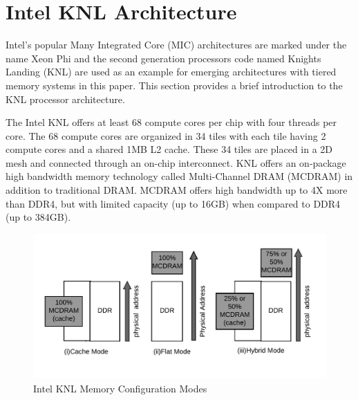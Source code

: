 \section{Intel KNL Architecture}
\label{src:knl}

Intel's popular Many Integrated Core (MIC) architectures are marked
under the name Xeon Phi and the second generation processors code
named Knights Landing (KNL) are used as an example for emerging
architectures with tiered memory systems in this paper. This section
provides a brief introduction to the KNL processor architecture.

The Intel KNL offers at least 68 compute cores per chip with four
threads per core. %
The 68 compute cores are organized
in 34 tiles with each tile having 2 compute cores and a shared 1MB
L2 cache. These 34 tiles are placed in a 2D mesh and connected through
an on-chip interconnect. KNL offers an on-package high bandwidth memory
technology called Multi-Channel DRAM (MCDRAM) in addition to traditional
DRAM. MCDRAM offers high bandwidth up to 4X more than DDR4, but with
limited capacity (up to 16GB) when compared to DDR4 (up to 384GB).

\begin{figure}[!h]
    \vspace{-20pt}
    \hspace*{5mm}
    \includegraphics[scale=0.20]{image/mem-mode.png}
    \vspace{-25pt}
    \caption{Intel KNL Memory Configuration Modes}
    \label{fig:memmode}
\end{figure}

